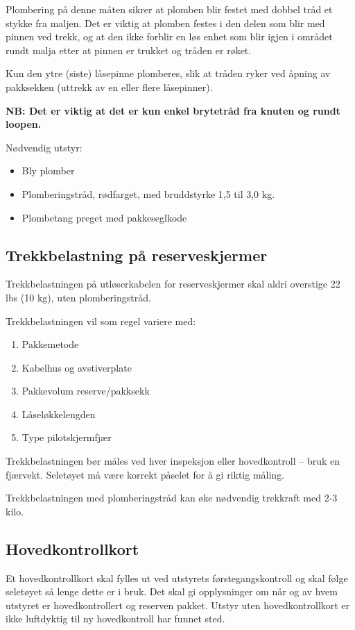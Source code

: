 Plombering på denne måten sikrer at plomben blir festet med dobbel tråd et stykke fra maljen. Det er viktig at plomben festes i den delen som blir med pinnen ved trekk, og at den ikke forblir en løs enhet som blir igjen i området rundt malja etter at pinnen er trukket og tråden er røket.

Kun den ytre (siste) låsepinne plomberes, slik at tråden ryker ved åpning av pakksekken (uttrekk av en eller flere låsepinner).

\textbf{NB: Det er viktig at det er kun enkel brytetråd fra knuten og rundt loopen.}

Nødvendig utstyr:
\begin{itemize}
	\item Bly plomber
	\item Plomberingstråd, rødfarget, med bruddstyrke 1,5 til 3,0 kg.
	\item Plombetang preget med pakkeseglkode
\end{itemize}

\subsection{Trekkbelastning på reserveskjermer}
Trekkbelastningen på utløserkabelen for reserveskjermer skal aldri overstige 22 lbs (10 kg), uten plomberingstråd.

Trekkbelastningen vil som regel variere med:
\begin{enumerate}
	\item Pakkemetode
	\item Kabelhus og avstiverplate
	\item Pakkevolum reserve/pakksekk
	\item Låseløkkelengden
	\item Type pilotskjermfjær
\end{enumerate}

Trekkbelastningen bør måles ved hver inspeksjon eller hovedkontroll – bruk en fjærvekt. Seletøyet må være korrekt påselet for å gi riktig måling.

Trekkbelastningen med plomberingstråd kan øke nødvendig trekkraft med 2-3 kilo.

\subsection{Hovedkontrollkort}
Et hovedkontrollkort skal fylles ut ved utstyrets førstegangskontroll og skal følge seletøyet så lenge dette er i bruk. Det skal gi opplysninger om når og av hvem utstyret er hovedkontrollert og reserven pakket. Utstyr uten hovedkontrollkort er ikke luftdyktig til ny hovedkontroll har funnet sted.

